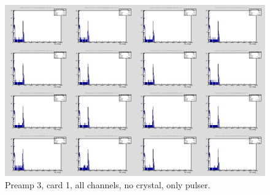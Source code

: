 \documentclass{report}
\begin{document}
\begin{figure}[!htb]
  \includegraphics[width=\linewidth]{preamp3_lim_energy_card1_all.png}
  \caption{Preamp 3, card 1, all channels, no crystal, only pulser.}
\end{figure}
\end{document}

